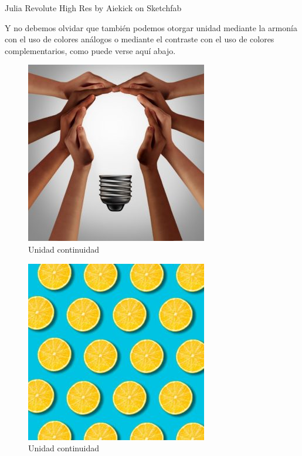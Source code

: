 \documentclass[
  16pt,
]{krantz}
\theoremstyle{definition}
\theoremstyle{definition}
\theoremstyle{definition}
\theoremstyle{definition}
\theoremstyle{remark}
\begin{document}
Julia Revolute High Res by Aiekick on Sketchfab

Y no debemos olvidar que también podemos otorgar unidad mediante la armonía con el uso de colores análogos o mediante el contraste con el uso de colores complementarios, como puede verse aquí abajo.

\begin{figure}

{\centering \includegraphics[width=0.5\linewidth,height=1\textheight]{unidad1} 

}

\caption{Unidad continuidad}\label{fig:unidad1}
\end{figure}

\begin{figure}

{\centering \includegraphics[width=0.5\linewidth,height=1\textheight]{unidad2} 

}

\caption{Unidad continuidad}\label{fig:unidad2}
\end{figure}
\end{document}
